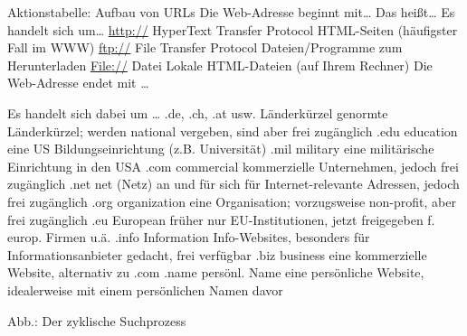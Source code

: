 \documentclass[]{book}
\theoremstyle{definition}
\theoremstyle{definition}
\theoremstyle{definition}
\theoremstyle{remark}
\begin{document}
Aktionstabelle: Aufbau von URLs Die Web-Adresse beginnt mit\ldots{} Das
heißt\ldots{} Es handelt sich um\ldots{} \url{http://} HyperText
Transfer Protocol HTML-Seiten (häufigster Fall im WWW) \url{ftp://} File
Transfer Protocol Dateien/Programme zum Herunterladen \url{File://}
Datei Lokale HTML-Dateien (auf Ihrem Rechner) Die Web-Adresse endet mit
\ldots{}

Es handelt sich dabei um \ldots{} .de, .ch, .at usw. Länderkürzel
genormte Länderkürzel; werden national vergeben, sind aber frei
zugänglich .edu education eine US Bildungseinrichtung (z.B. Universität)
.mil military eine militärische Einrichtung in den USA .com commercial
kommerzielle Unternehmen, jedoch frei zugänglich .net net (Netz) an und
für sich für Internet-relevante Adressen, jedoch frei zugänglich .org
organization eine Organisation; vorzugsweise non-profit, aber frei
zugänglich .eu European früher nur EU-Institutionen, jetzt freigegeben
f. europ. Firmen u.ä. .info Information Info-Websites, besonders für
Informationsanbieter gedacht, frei verfügbar .biz business eine
kommerzielle Website, alternativ zu .com .name persönl. Name eine
persönliche Website, idealerweise mit einem persönlichen Namen davor

Abb.: Der zyklische Suchprozess
\end{document}
